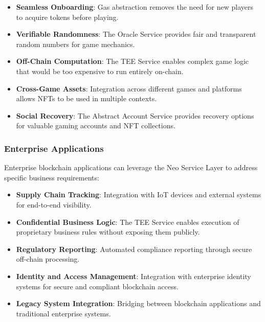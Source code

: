 \begin{itemize}
    \item \textbf{Seamless Onboarding}: Gas abstraction removes the need for new players to acquire tokens before playing.
    
    \item \textbf{Verifiable Randomness}: The Oracle Service provides fair and transparent random numbers for game mechanics.
    
    \item \textbf{Off-Chain Computation}: The TEE Service enables complex game logic that would be too expensive to run entirely on-chain.
    
    \item \textbf{Cross-Game Assets}: Integration across different games and platforms allows NFTs to be used in multiple contexts.
    
    \item \textbf{Social Recovery}: The Abstract Account Service provides recovery options for valuable gaming accounts and NFT collections.
\end{itemize}

\subsubsection{Enterprise Applications}
\label{subsubsec:enterprise}

Enterprise blockchain applications can leverage the Neo Service Layer to address specific business requirements:

\begin{itemize}
    \item \textbf{Supply Chain Tracking}: Integration with IoT devices and external systems for end-to-end visibility.
    
    \item \textbf{Confidential Business Logic}: The TEE Service enables execution of proprietary business rules without exposing them publicly.
    
    \item \textbf{Regulatory Reporting}: Automated compliance reporting through secure off-chain processing.
    
    \item \textbf{Identity and Access Management}: Integration with enterprise identity systems for secure and compliant blockchain access.
    
    \item \textbf{Legacy System Integration}: Bridging between blockchain applications and traditional enterprise systems.
\end{itemize}

